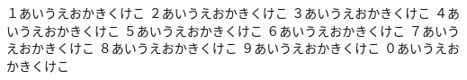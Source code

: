 \documentclass{tarticle}
\begin{document}
１あいうえおかきくけこ
２あいうえおかきくけこ
３あいうえおかきくけこ
４あいうえおかきくけこ
５あいうえおかきくけこ
６あいうえおかきくけこ
７あいうえおかきくけこ
８あいうえおかきくけこ
９あいうえおかきくけこ
０あいうえおかきくけこ
\end{document}
